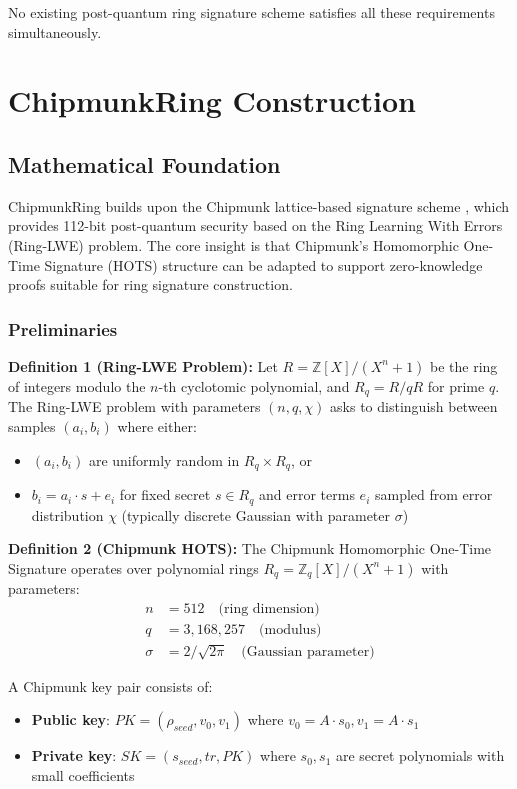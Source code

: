 \documentclass[11pt,a4paper]{article}
\begin{document}
No existing post-quantum ring signature scheme satisfies all these requirements simultaneously.

\section{ChipmunkRing Construction}

\subsection{Mathematical Foundation}

ChipmunkRing builds upon the Chipmunk lattice-based signature scheme \cite{chipmunk}, which provides 112-bit post-quantum security based on the Ring Learning With Errors (Ring-LWE) problem. The core insight is that Chipmunk's Homomorphic One-Time Signature (HOTS) structure can be adapted to support zero-knowledge proofs suitable for ring signature construction.

\subsubsection{Preliminaries}

\textbf{Definition 1 (Ring-LWE Problem):} Let $R = \mathbb{Z}[X]/(X^n + 1)$ be the ring of integers modulo the $n$-th cyclotomic polynomial, and $R_q = R/qR$ for prime $q$. The Ring-LWE problem with parameters $(n, q, \chi)$ asks to distinguish between samples $(a_i, b_i)$ where either:
\begin{itemize}
\item $(a_i, b_i)$ are uniformly random in $R_q \times R_q$, or  
\item $b_i = a_i \cdot s + e_i$ for fixed secret $s \in R_q$ and error terms $e_i$ sampled from error distribution $\chi$ (typically discrete Gaussian with parameter $\sigma$)
\end{itemize}

\textbf{Definition 2 (Chipmunk HOTS):} The Chipmunk Homomorphic One-Time Signature operates over polynomial rings $R_q = \mathbb{Z}_q[X]/(X^n + 1)$ with parameters:
\begin{align}
n &= 512 \quad \text{(ring dimension)} \\
q &= 3,168,257 \quad \text{(modulus)} \\
\sigma &= 2/\sqrt{2\pi} \quad \text{(Gaussian parameter)}
\end{align}

A Chipmunk key pair consists of:
\begin{itemize}
\item \textbf{Public key}: $PK = (\rho_{seed}, v_0, v_1)$ where $v_0 = A \cdot s_0, v_1 = A \cdot s_1$
\item \textbf{Private key}: $SK = (s_{seed}, tr, PK)$ where $s_0, s_1$ are secret polynomials with small coefficients
\end{itemize}
\end{document}
